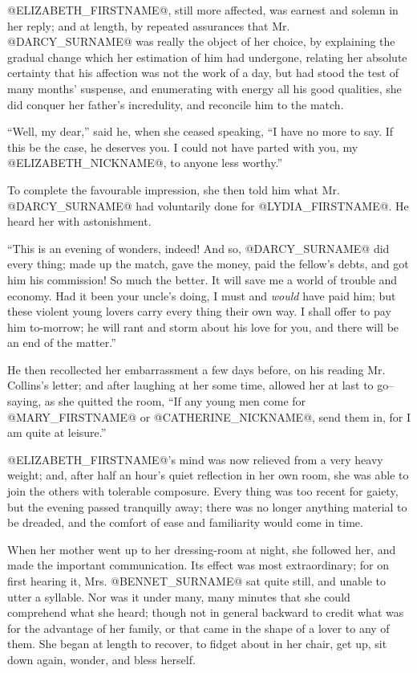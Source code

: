 @ELIZABETH_FIRSTNAME@, still more affected, was earnest and solemn in her reply; and
at length, by repeated assurances that Mr. @DARCY_SURNAME@ was really the object
of her choice, by explaining the gradual change which her estimation of
him had undergone, relating her absolute certainty that his affection
was not the work of a day, but had stood the test of many months'
suspense, and enumerating with energy all his good qualities, she did
conquer her father's incredulity, and reconcile him to the match.

``Well, my dear,'' said he, when she ceased speaking, ``I have no more to
say. If this be the case, he deserves you. I could not have parted with
you, my @ELIZABETH_NICKNAME@, to anyone less worthy.''

To complete the favourable impression, she then told him what Mr. @DARCY_SURNAME@
had voluntarily done for @LYDIA_FIRSTNAME@. He heard her with astonishment.

``This is an evening of wonders, indeed! And so, @DARCY_SURNAME@ did every thing;
made up the match, gave the money, paid the fellow's debts, and got him
his commission! So much the better. It will save me a world of trouble
and economy. Had it been your uncle's doing, I must and \textit{would} have
paid him; but these violent young lovers carry every thing their own
way. I shall offer to pay him to-morrow; he will rant and storm about
his love for you, and there will be an end of the matter.''

He then recollected her embarrassment a few days before, on his reading
Mr. Collins's letter; and after laughing at her some time, allowed her
at last to go--saying, as she quitted the room, ``If any young men come
for @MARY_FIRSTNAME@ or @CATHERINE_NICKNAME@, send them in, for I am quite at leisure.''

@ELIZABETH_FIRSTNAME@'s mind was now relieved from a very heavy weight; and, after
half an hour's quiet reflection in her own room, she was able to join
the others with tolerable composure. Every thing was too recent for
gaiety, but the evening passed tranquilly away; there was no longer
anything material to be dreaded, and the comfort of ease and familiarity
would come in time.

When her mother went up to her dressing-room at night, she followed her,
and made the important communication. Its effect was most extraordinary;
for on first hearing it, Mrs. @BENNET_SURNAME@ sat quite still, and unable to
utter a syllable. Nor was it under many, many minutes that she could
comprehend what she heard; though not in general backward to credit
what was for the advantage of her family, or that came in the shape of a
lover to any of them. She began at length to recover, to fidget about in
her chair, get up, sit down again, wonder, and bless herself.

